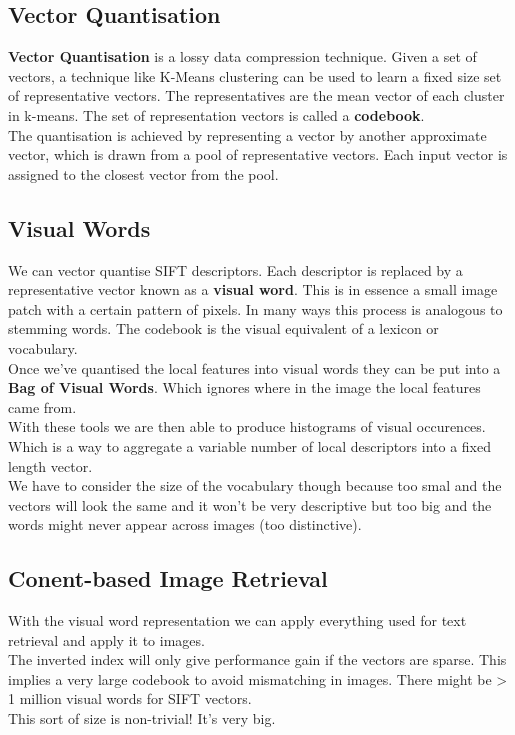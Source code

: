 \documentclass{article}
\begin{document}
	\subsection*{Vector Quantisation}
	{\bfseries Vector Quantisation} is a lossy data compression technique. Given a set of vectors, a technique like K-Means clustering can be used to learn a fixed size set of representative vectors. The representatives are the mean vector of each cluster in k-means. The set of representation vectors is called a {\bfseries codebook}.\\
	The quantisation is achieved by representing a vector by another approximate vector, which is drawn from a pool of representative vectors. Each input vector is assigned to the closest vector from the pool.
	
	\subsection*{Visual Words}
	We can vector quantise SIFT descriptors. Each descriptor is replaced by a representative vector known as a {\bfseries visual word}. This is in essence a small image patch with a certain pattern of pixels. In many ways this process is analogous to stemming words. The codebook is the visual equivalent of a lexicon or vocabulary.\\
	Once we've quantised the local features into visual words they can be put into a {\bfseries Bag of Visual Words}. Which ignores where in the image the local features came from.\\
	With these tools we are then able to produce histograms of visual occurences. Which is a way to aggregate a variable number of local descriptors into a fixed length vector.\\
	We have to consider the size of the vocabulary though because too smal and the vectors will look the same and it won't be very descriptive but too big and the words might never appear across images (too distinctive).
	
	\subsection*{Conent-based Image Retrieval}
	With the visual word representation we can apply everything used for text retrieval and apply it to images.\\
	The inverted index will only give performance gain if the vectors are sparse. This implies a very large codebook to avoid mismatching in images. There might be > 1 million visual words for SIFT vectors.\\
	This sort of size is non-trivial! It's very big.
	
\end{document}
